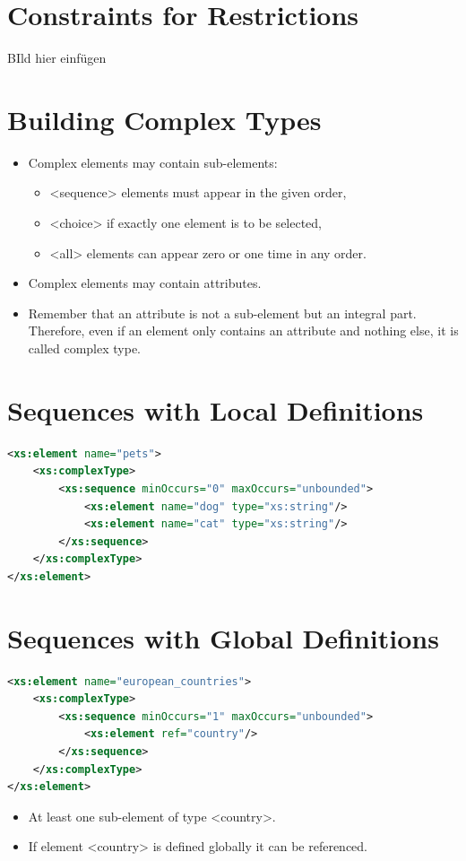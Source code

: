 \section{Constraints for Restrictions}
BIld hier einfügen

\section{Building Complex Types}
\begin{itemize}
\item Complex elements may contain sub-elements:
\begin{itemize}
\item <sequence> elements must appear in the given order,
\item <choice> if exactly one element is to be selected,
\item <all> elements can appear zero or one time in any order.
\end{itemize}
\item Complex elements may contain attributes.
\item Remember that an attribute is not a sub-element but an integral part. Therefore, even if an element only contains an attribute and nothing else, it is called complex type.
\end{itemize}

\section{Sequences with Local Definitions}

\begin{lstlisting}[language=XML, caption={Sequences with Local Definitions}]
<xs:element name="pets">
	<xs:complexType>
		<xs:sequence minOccurs="0" maxOccurs="unbounded">
			<xs:element name="dog" type="xs:string"/>
      		<xs:element name="cat" type="xs:string"/>
		</xs:sequence>
 	</xs:complexType>
</xs:element>
\end{lstlisting}

\section{Sequences with Global Definitions}
\begin{lstlisting}[language=XML, caption={Sequences with Global Definitions}]
<xs:element name="european_countries">
	<xs:complexType>
		<xs:sequence minOccurs="1" maxOccurs="unbounded">
			<xs:element ref="country"/>
		</xs:sequence>
	</xs:complexType>
</xs:element>
\end{lstlisting}
\begin{itemize}
\item At least one sub-element of type <country>.
\item If element <country> is defined globally it can be referenced.
\end{itemize}

